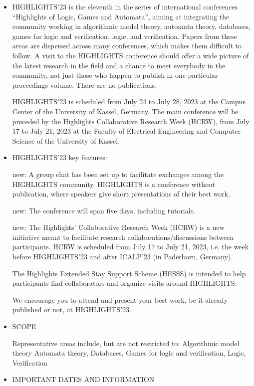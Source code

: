 \documentclass[prodmode,acmtecs]{acmsmall} %
\begin{document}
\begin{itemize}\item  HIGHLIGHTS’23 is the eleventh in the series of international conferences “Highlights of Logic, Games and Automata”, aiming at integrating the community working in algorithmic model theory, automata theory, databases, games for logic and verification, logic, and verification. Papers from these areas are dispersed across many conferences, which makes them difficult to follow. A visit to the HIGHLIGHTS conference should offer a wide picture of the latest research in the field and a chance to meet everybody in the community, not just those who happen to publish in one particular proceedings volume. There are no publications. 
 
  HIGHLIGHTS’23 is scheduled from July 24 to July 28, 2023 at the Campus Center of the University of Kassel, Germany. The main conference will be preceded by the Highlights Collaborative Research Week (HCRW), from July 17 to July 21, 2023 at the Faculty of Electrical Engineering and Computer Science of the University of Kassel. 
 
\item  HIGHLIGHTS’23 key features:  
 
  new: A group chat has been set up to facilitate exchanges among the HIGHLIGHTS community. HIGHLIGHTS is a conference without publication, where speakers give short presentations of their best work.  
 
  new: The conference will span five days, including tutorials.  
 
  new: The Highlights’ Collaborative Research Week (HCRW) is a new initiative meant to facilitate research collaborations/discussions between participants. HCRW is scheduled from July 17 to July 21, 2023, i.e. the week before HIGHLIGHTS’23 and after ICALP’23 (in Paderborn, Germany).  
 
  The Highlights Extended Stay Support Scheme (HESSS) is intended to help participants find collaborators and organize visits around HIGHLIGHTS.  
 
  We encourage you to attend and present your best work, be it already published or not, at HIGHLIGHTS’23. 
 
\item  SCOPE 
 
  Representative areas include, but are not restricted to: Algorithmic model theory Automata theory, Databases, Games for logic and verification, Logic, Verification 
 
\item  IMPORTANT DATES AND INFORMATION 
 

\end{itemize}
\end{document}
